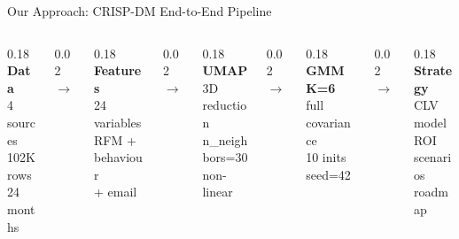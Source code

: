 \documentclass[aspectratio=169,10pt]{beamer}
\begin{document}
\begin{frame}{Our Approach: CRISP-DM End-to-End Pipeline}
\centering
\begin{columns}[c]
  \begin{column}{0.18\textwidth}\centering
    \textbf{Data}\\{\small 4 sources\\102K rows\\24 months}
  \end{column}
  \begin{column}{0.02\textwidth}\centering$\rightarrow$\end{column}
  \begin{column}{0.18\textwidth}\centering
    \textbf{Features}\\{\small 24 variables\\RFM + behaviour\\+ email}
  \end{column}
  \begin{column}{0.02\textwidth}\centering$\rightarrow$\end{column}
  \begin{column}{0.18\textwidth}\centering
    \textbf{UMAP}\\{\small 3D reduction\\n\_neighbors=30\\non-linear}
  \end{column}
  \begin{column}{0.02\textwidth}\centering$\rightarrow$\end{column}
  \begin{column}{0.18\textwidth}\centering
    \textbf{GMM K=6}\\{\small full covariance\\10 inits\\seed=42}
  \end{column}
  \begin{column}{0.02\textwidth}\centering$\rightarrow$\end{column}
  \begin{column}{0.18\textwidth}\centering
    \textbf{Strategy}\\{\small CLV model\\ROI scenarios\\roadmap}
  \end{column}
\end{columns}


\end{frame}
\end{document}
